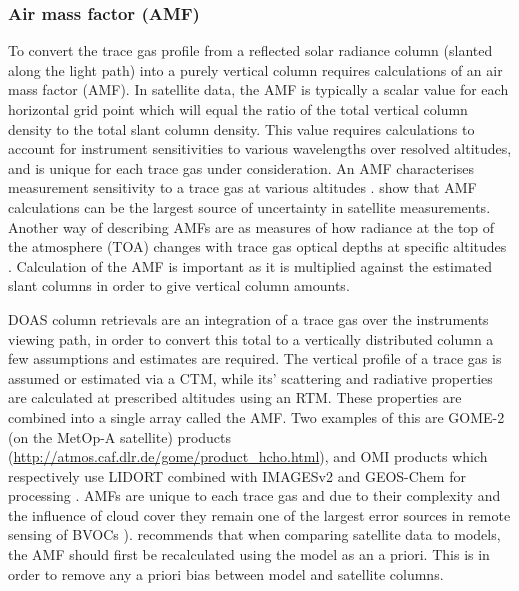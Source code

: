   \subsubsection{Air mass factor (AMF)}
    
    To convert the trace gas profile from a reflected solar radiance column (slanted along the light path) into a purely vertical column requires calculations of an air mass factor (AMF).
    In satellite data, the AMF is typically a scalar value for each horizontal grid point which will equal the ratio of the total vertical column density to the total slant column density.
    This value requires calculations to account for instrument sensitivities to various wavelengths over resolved altitudes, and is unique for each trace gas under consideration.
    An AMF characterises measurement sensitivity to a trace gas at various altitudes \cite[e.g.]{Palmer2001}.
    \textcite{Lorente2017} show that AMF calculations can be the largest source of uncertainty in satellite measurements.
    Another way of describing AMFs are as measures of how radiance at the top of the atmosphere (TOA) changes with trace gas optical depths at specific altitudes \parencite{Lorente2017}.
    Calculation of the AMF is important as it is multiplied against the estimated slant columns in order to give vertical column amounts.
    
    DOAS column retrievals are an integration of a trace gas over the instruments viewing path, in order to convert this total to a vertically distributed column a few assumptions and estimates are required. 
    The vertical profile of a trace gas is assumed or estimated via a CTM, while its' scattering and radiative properties are calculated at prescribed altitudes using an RTM. 
    These properties are combined into a single array called the AMF.
    Two examples of this are GOME-2 (on the MetOp-A satellite) products (\url{http://atmos.caf.dlr.de/gome/product_hcho.html}), and OMI products which respectively use LIDORT combined with IMAGESv2 and GEOS-Chem for processing \parencite{Chance2002, Abad2015}.
    AMFs are unique to each trace gas and due to their complexity and the influence of cloud cover they remain one of the largest error sources in remote sensing of BVOCs \parencite{Palmer2001,Millet2006}).
    \textcite{Lamsal2014} recommends that when comparing satellite data to models, the AMF should first be recalculated using the model as an a priori.
    This is in order to remove any a priori bias between model and satellite columns.
    
